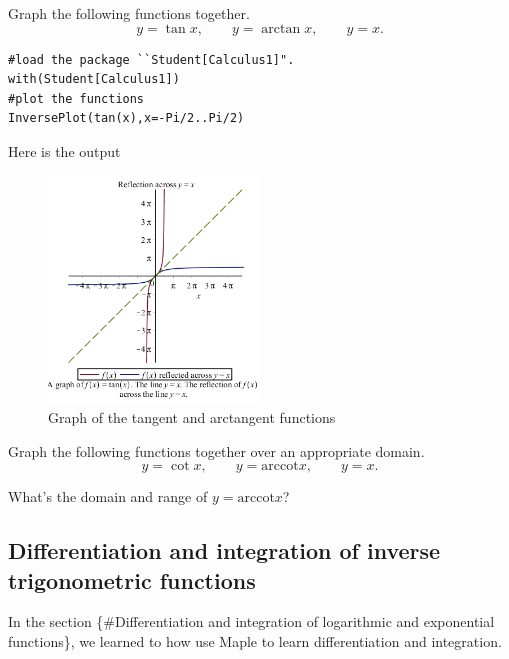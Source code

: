 \documentclass[en,11pt,simple]{elegantbook}
\let\BeginKnitrBlock\begin \let\EndKnitrBlock\end
\begin{document}
\BeginKnitrBlock{example}{}{}
\protect\hypertarget{exm:unnamed-chunk-185}{}{\label{exm:unnamed-chunk-185} }
Graph the following functions together.
\[
y=\tan x, \qquad y=\arctan x, \qquad y=x.
\]
\EndKnitrBlock{example}

\BeginKnitrBlock{solution}{}{}
{}

\begin{verbatim}
#load the package ``Student[Calculus1]".
with(Student[Calculus1])
#plot the functions
InversePlot(tan(x),x=-Pi/2..Pi/2)
\end{verbatim}

Here is the output

\begin{figure}
\centering
\includegraphics[width=0.5\textwidth,height=\textheight]{figs/InversePlot_tanx.png}
\caption{Graph of the tangent and arctangent functions}
\end{figure}
\EndKnitrBlock{solution}

\BeginKnitrBlock{exercise}{}{}
\protect\hypertarget{exr:unnamed-chunk-187}{}{\label{exr:unnamed-chunk-187} }
Graph the following functions together over an appropriate domain.
\[
y=\cot x, \qquad y=\mathrm{arccot} x, \qquad y=x.
\]

What's the domain and range of \(y=\mathrm{arccot} x\)?
\EndKnitrBlock{exercise}

\hypertarget{differentiation-and-integration-of-inverse-trigonometric-functions}{%
\subsection{Differentiation and integration of inverse trigonometric functions}\label{differentiation-and-integration-of-inverse-trigonometric-functions}}

In the section \{\#Differentiation and integration of logarithmic and exponential functions\}, we learned to how use Maple to learn differentiation and integration.
\end{document}

